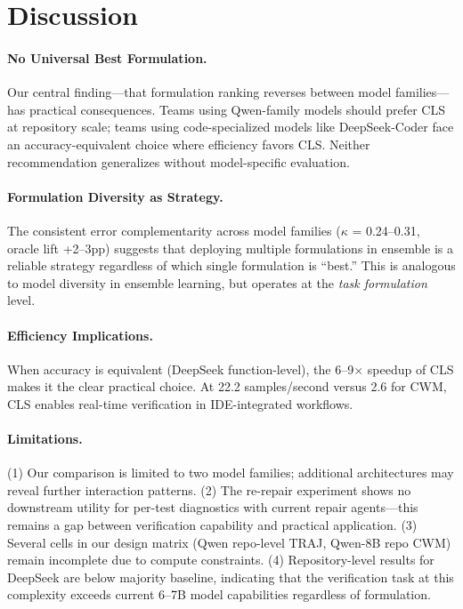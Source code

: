 \documentclass[11pt,a4paper]{article}
\begin{document}
\section{Discussion}

\paragraph{No Universal Best Formulation.} Our central finding---that formulation ranking reverses between model families---has practical consequences. Teams using Qwen-family models should prefer CLS at repository scale; teams using code-specialized models like DeepSeek-Coder face an accuracy-equivalent choice where efficiency favors CLS. Neither recommendation generalizes without model-specific evaluation.

\paragraph{Formulation Diversity as Strategy.} The consistent error complementarity across model families ($\kappa$ = 0.24--0.31, oracle lift +2--3pp) suggests that deploying multiple formulations in ensemble is a reliable strategy regardless of which single formulation is ``best.'' This is analogous to model diversity in ensemble learning, but operates at the \emph{task formulation} level.

\paragraph{Efficiency Implications.} When accuracy is equivalent (DeepSeek function-level), the 6--9$\times$ speedup of CLS makes it the clear practical choice. At 22.2 samples/second versus 2.6 for CWM, CLS enables real-time verification in IDE-integrated workflows.

\paragraph{Limitations.}
(1) Our comparison is limited to two model families; additional architectures may reveal further interaction patterns.
(2) The re-repair experiment shows no downstream utility for per-test diagnostics with current repair agents---this remains a gap between verification capability and practical application.
(3) Several cells in our design matrix (Qwen repo-level TRAJ, Qwen-8B repo CWM) remain incomplete due to compute constraints.
(4) Repository-level results for DeepSeek are below majority baseline, indicating that the verification task at this complexity exceeds current 6--7B model capabilities regardless of formulation.
\end{document}
